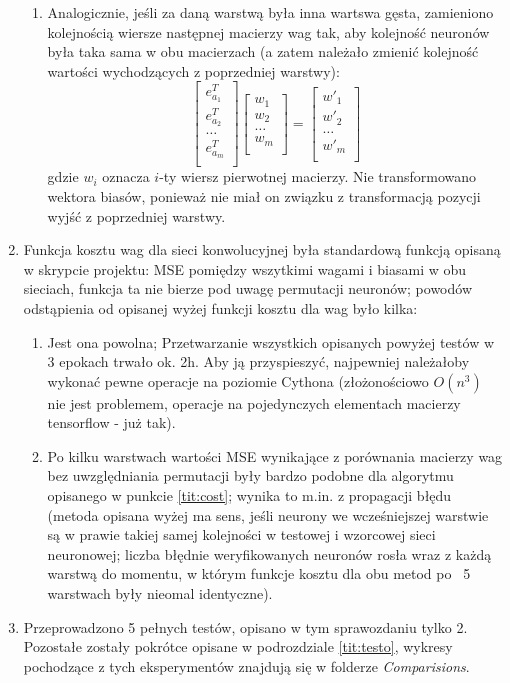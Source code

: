 \documentclass[12pt]{article}
\begin{document}
\begin{enumerate}
\begin{enumerate}
		\item Analogicznie, jeśli za daną warstwą była inna wartswa gęsta, zamieniono kolejnością wiersze następnej macierzy wag tak, aby kolejność neuronów była taka sama w obu macierzach (a zatem należało zmienić kolejność wartości wychodzących z poprzedniej warstwy):
		$$\begin{bmatrix}
			e_{a_1}^T\\ e_{a_2}^T\\ \dots\\ e_{a_m}^T\\
		\end{bmatrix}
		\begin{bmatrix}
			w_1\\ w_2\\ \dots\\ w_m\\
		\end{bmatrix}
		=
		\begin{bmatrix}
			w'_1\\ w'_2\\ \dots\\ w'_m\\
		\end{bmatrix}
		$$ gdzie $w_i$ oznacza $i$-ty wiersz pierwotnej macierzy. Nie transformowano wektora biasów, ponieważ nie miał on związku z transformacją pozycji wyjść z poprzedniej warstwy.
	\end{enumerate}
	\item \label{tit:cost_cnn} Funkcja kosztu wag dla sieci konwolucyjnej była standardową funkcją opisaną w skrypcie projektu: MSE pomiędzy wszytkimi wagami i biasami w obu sieciach, funkcja ta nie bierze pod uwagę permutacji neuronów; powodów odstąpienia od opisanej wyżej funkcji kosztu dla wag było kilka:
	\begin{enumerate}
		\item Jest ona powolna; Przetwarzanie wszystkich opisanych powyżej testów w 3 epokach trwało ok. 2h. Aby ją przyspieszyć, najpewniej należałoby wykonać pewne operacje na poziomie Cythona (złożonościowo $O(n^3)$ nie jest problemem, operacje na pojedynczych elementach macierzy tensorflow - już tak).
		\item Po kilku warstwach wartości MSE wynikające z porównania macierzy wag bez uwzględniania permutacji były bardzo podobne dla algorytmu opisanego w punkcie \ref{tit:cost}; wynika to m.in. z propagacji błędu (metoda opisana wyżej ma sens, jeśli neurony we wcześniejszej warstwie są w prawie takiej samej kolejności w testowej i wzorcowej sieci neuronowej; liczba błędnie weryfikowanych neuronów rosła wraz z każdą warstwą do momentu, w którym funkcje kosztu dla obu metod po ~5 warstwach były nieomal identyczne).
	\end{enumerate}
	\item Przeprowadzono 5 pełnych testów, opisano w tym sprawozdaniu tylko 2. Pozostałe zostały pokrótce opisane w podrozdziale \ref{tit:testo}, wykresy pochodzące z tych eksperymentów znajdują się w folderze \textit{Comparisions}.

\end{enumerate}
\end{document}
